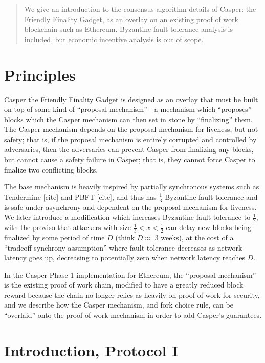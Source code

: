 \documentclass[12pt]{article}
\begin{document}
\maketitle
\begin{abstract}
We give an introduction to the consensus algorithm details of Casper: the Friendly Finality Gadget, as an overlay on an existing proof of work blockchain such as Ethereum. Byzantine fault tolerance analysis is included, but economic incentive analysis is out of scope.
\end{abstract}

\section{Principles}
Casper the Friendly Finality Gadget is designed as an overlay that must be built on top of some kind of ``proposal mechanism'' - a mechanism which ``proposes'' blocks which the Casper mechanism can then set in stone by ``finalizing'' them. The Casper mechanism depends on the proposal mechanism for liveness, but not safety; that is, if the proposal mechanism is entirely corrupted and controlled by adversaries, then the adversaries can prevent Casper from finalizing any blocks, but cannot cause a safety failure in Casper; that is, they cannot force Casper to finalize two conflicting blocks.

The base mechanism is heavily inspired by partially synchronous systems such as Tendermine [cite] and PBFT [cite], and thus has $\frac{1}{3}$ Byzantine fault tolerance and is safe under asynchrony and dependent on the proposal mechanism for liveness. We later introduce a modification which increases Byzantine fault tolerance to $\frac{1}{2}$, with the proviso that attackers with size $\frac{1}{3} < x < \frac{1}{2}$ can delay new blocks being finalized by some period of time $D$ (think $D \approx$ 3 weeks), at the cost of a ``tradeoff synchrony assumption'' where fault tolerance decreases as network latency goes up, decreasing to potentially zero when network latency reaches $D$.

In the Casper Phase 1 implementation for Ethereum, the ``proposal mechanism'' is the existing proof of work chain, modified to have a greatly reduced block reward because the chain no longer relies as heavily on proof of work for security, and we describe how the Casper mechanism, and fork choice rule, can be ``overlaid'' onto the proof of work mechanism in order to add Casper's guarantees.

\section{Introduction, Protocol I}
\end{document}
